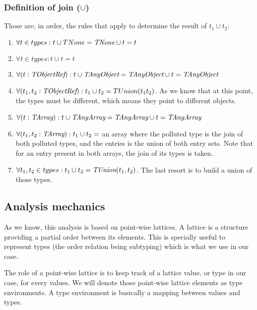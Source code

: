 \documentclass[a4paper]{article}
\begin{document}
\subsubsection{Definition of join ($\cup$)}
Those are, in order, the rules that apply to determine the result of $t_1 \cup t_2$:
\begin{enumerate}
  \item $\forall t \in types : t \cup TNone = \emph{TNone} \cup t = t$
  \item $\forall t \in types : t \cup t = t$
  \item $\forall (t: \emph{TObjectRef}): t \cup \emph{TAnyObject} = \emph{TAnyObject} \cup t = \emph{TAnyObject}$
  \item $\forall (t_1,t_2: \emph{TObjectRef}): t_1 \cup t_2 = TUnion(t_1 t_2)$. As we
    know that at this point, the types must be different, which means they
    point to different objects.
  \item $\forall (t: \emph{TArray}): t \cup \emph{TAnyArray} = \emph{TAnyArray} \cup t = \emph{TAnyArray}$
  \item $\forall (t_1,t_2: \emph{TArray}): t_1 \cup t_2 = $ an array where the
    polluted type is the join of both polluted types, and the entries is the
    union of both entry sets. Note that for an entry present in both arrays,
    the join of its types is taken.

  \item $\forall t_1,t_2 \in types: t_1 \cup t_2 = \emph{TUnion}(t_1, t_2)$. The last
    resort is to build a union of those types.
\end{enumerate}

\subsection{Analysis mechanics}
As we know, this analysis is based on point-wise lattices. A lattice is a
structure providing a partial order between its elements. This is specially
useful to represent types (the order relation being subtyping) which is what
we use in our case.

The role of a point-wise lattice is to keep track of a lattice value, or type in
our case, for every values. We will denote those point-wise lattice elements as
type environments. A type environment is basically a mapping between values and
types.
\end{document}
